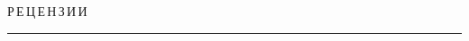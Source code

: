 \def\stat{rez}


{%




\raggedleft\Large \bf%


Р\,Е\,Ц\,Е\,Н\,З\,И\,И \vskip 17pt


    \hrule


    \par


 }












\def\tit{НОВАЯ КНИГА И.\,Н.~СИНИЦЫНА, А.\,С.~ШАЛАМОВА <<ЛЕКЦИИ ПО ТЕОРИИ 


ИНТЕГРИРОВАННОЙ ЛОГИСТИЧЕСКОЙ ПОДДЕРЖКИ>> (М.: ТОРУС ПРЕСС, 2012. 624~с.)}







\def\aut{Д.ф.-м.н., профессор С.\,Я.~Шоргин}





\def\auf{\ }





\def\leftkol{\ %


}





\def\rightkol{ \ } 

























